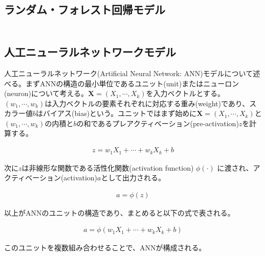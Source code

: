 \documentclass[a4paper, 12pt]{jsreport}
\begin{document}
\subsection{ランダム・フォレスト回帰モデル}

\begin{equation}
  \begin{split}
  \end{split}
\end{equation}

\subsection{人工ニューラルネットワークモデル}

人工ニューラルネットワーク(Artificial Neural Network: ANN)モデルについて述べる。まずANNの構造の最小単位であるユニット(unit)またはニューロン(neuron)について考える。$\bm{X}=(X_1, \cdots, X_k)$を入力ベクトルとする。$(w_1, \cdots, w_k)$は入力ベクトルの要素それぞれに対応する重み(weight)であり、スカラー値$b$はバイアス(bias)という。ユニットではまず始めに$\bm{X}=(X_1, \cdots, X_k)$と$(w_1, \cdots, w_k)$の内積と$b$の和であるプレアクティベーション(pre-activation)$z$を計算する。

\begin{equation}
  \begin{split}
    z = w_1 X_1 + \cdots + w_k X_k + b
  \end{split}
\end{equation}

次に$z$は非線形な関数である活性化関数(activation function) $\phi(\cdot)$ に渡され、アクティベーション(activation)$a$として出力される。

\begin{equation}
  \begin{split}
    a = \phi(z)
  \end{split}
\end{equation}

以上がANNのユニットの構造であり、まとめると以下の式で表される。

\begin{equation}
  \begin{split}
    a = \phi(w_1 X_1 + \cdots + w_k X_k + b)
  \end{split}
\end{equation}


このユニットを複数組み合わせることで、ANNが構成される。
\end{document}
